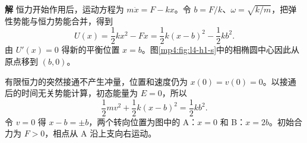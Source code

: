 \documentclass[11pt,openany,fontset=fandol]{ctexbook}
\theoremstyle{definition}\newtheorem{example}{例}[chapter]\newtheorem{exercise}{习题}[chapter]
\newcommand{\SolutionStart}{\par\medskip\ifdim\pagetotal>0pt\ifdim\dimexpr\pagegoal-\pagetotal\relax<3\baselineskip\newpage\fi\fi\noindent\textbf{解}\quad\ignorespaces}
\newenvironment{solution}{\SolutionStart}{\par\medskip}
\begin{document}
\begin{solution}
恒力开始作用后，运动方程为 $m\ddot x=F-kx$。令 $b=F/k$、$\omega=\sqrt{k/m}$，把弹性势能与恒力势能合并，得到
\[
U(x)=\frac12kx^2-Fx
=\frac12k(x-b)^2-\frac12kb^2.
\]
由 $U'(x)=0$ 得新的平衡位置 $x=b$。图\ref{mp4:fig:l4-h1-s}中的相椭圆中心因此从原点移到 $(b,0)$。

有限恒力的突然接通不产生冲量，位置和速度仍为 $x(0)=v(0)=0$。以接通后的时间无关势能计算，初态能量为 $E=0$，所以
\[
\frac12mv^2+\frac12k(x-b)^2=\frac12kb^2.
\]
令 $v=0$ 得 $x-b=\pm b$，两个转向位置为图中的 A：$x=0$ 和 B：$x=2b$。初始合力为 $F>0$，相点从 A 沿上支向右运动。

\begin{figure}[H]\centering
{}
\end{figure}
\end{solution}
\end{document}

